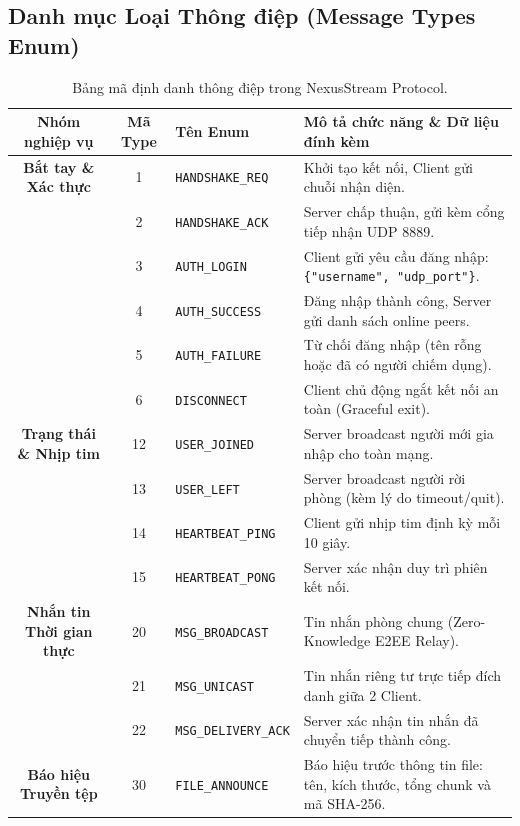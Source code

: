 \documentclass[11pt,a4paper]{article}
\begin{document}
\subsection{Danh mục Loại Thông điệp (Message Types Enum)}
\begin{table}[htbp]
\centering
\small
\begin{tabular}{cclp{7.5cm}}
\toprule
\rowcolor{headergray}
\textbf{Nhóm nghiệp vụ} & \textbf{Mã Type} & \textbf{Tên Enum} & \textbf{Mô tả chức năng \& Dữ liệu đính kèm} \\
\midrule
\textbf{Bắt tay \& Xác thực} & 1 & \texttt{HANDSHAKE\_REQ} & Khởi tạo kết nối, Client gửi chuỗi nhận diện. \\
& 2 & \texttt{HANDSHAKE\_ACK} & Server chấp thuận, gửi kèm cổng tiếp nhận UDP 8889. \\
& 3 & \texttt{AUTH\_LOGIN} & Client gửi yêu cầu đăng nhập: \texttt{\{"username", "udp\_port"\}}. \\
& 4 & \texttt{AUTH\_SUCCESS} & Đăng nhập thành công, Server gửi danh sách online peers. \\
& 5 & \texttt{AUTH\_FAILURE} & Từ chối đăng nhập (tên rỗng hoặc đã có người chiếm dụng). \\
& 6 & \texttt{DISCONNECT} & Client chủ động ngắt kết nối an toàn (Graceful exit). \\
\midrule
\textbf{Trạng thái \& Nhịp tim} & 12 & \texttt{USER\_JOINED} & Server broadcast người mới gia nhập cho toàn mạng. \\
& 13 & \texttt{USER\_LEFT} & Server broadcast người rời phòng (kèm lý do timeout/quit). \\
& 14 & \texttt{HEARTBEAT\_PING} & Client gửi nhịp tim định kỳ mỗi 10 giây. \\
& 15 & \texttt{HEARTBEAT\_PONG} & Server xác nhận duy trì phiên kết nối. \\
\midrule
\textbf{Nhắn tin Thời gian thực} & 20 & \texttt{MSG\_BROADCAST} & Tin nhắn phòng chung (Zero-Knowledge E2EE Relay). \\
& 21 & \texttt{MSG\_UNICAST} & Tin nhắn riêng tư trực tiếp đích danh giữa 2 Client. \\
& 22 & \texttt{MSG\_DELIVERY\_ACK} & Server xác nhận tin nhắn đã chuyển tiếp thành công. \\
\midrule
\textbf{Báo hiệu Truyền tệp} & 30 & \texttt{FILE\_ANNOUNCE} & Báo hiệu trước thông tin file: tên, kích thước, tổng chunk và mã SHA-256. \\
\bottomrule
\end{tabular}
\caption{Bảng mã định danh thông điệp trong NexusStream Protocol.}
\label{tab:msg_types}
\end{table}
\end{document}
